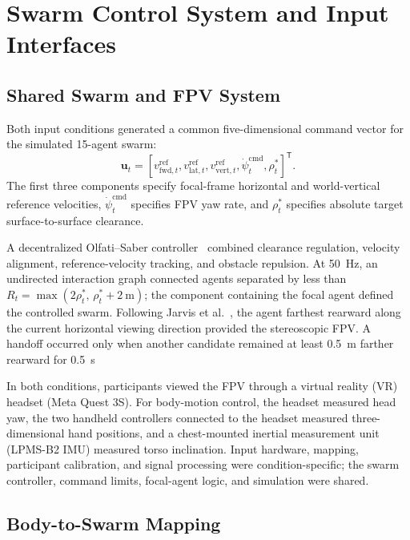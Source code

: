 \section{Swarm Control System and Input Interfaces}

\subsection{Shared Swarm and FPV System}
\label{sec:system}

Both input conditions generated a common five-dimensional command vector for
the simulated 15-agent swarm:
\begin{equation}
\mathbf{u}_t =
\left[
v_{\mathrm{fwd},t}^{\mathrm{ref}},
v_{\mathrm{lat},t}^{\mathrm{ref}},
v_{\mathrm{vert},t}^{\mathrm{ref}},
\dot{\psi}_{t}^{\mathrm{cmd}},
\rho_t^{*}
\right]^{\mathsf T}.
\label{eq:swarm_command}
\end{equation}
The first three components specify focal-frame horizontal and world-vertical
reference velocities, $\dot{\psi}_{t}^{\mathrm{cmd}}$ specifies FPV yaw rate,
and $\rho_t^{*}$ specifies absolute target surface-to-surface clearance.

A decentralized Olfati--Saber controller~\cite{olfatisaber2006flocking}
combined clearance regulation, velocity alignment, reference-velocity
tracking, and obstacle repulsion. At 50~Hz, an undirected interaction graph
connected agents separated by less than
$R_t=\max(2\rho_t^{*},\,\rho_t^{*}+2~\mathrm{m})$; the component containing
the focal agent defined the controlled swarm. Following Jarvis et
al.~\cite{ben_focaldrone}, the agent farthest rearward along the current
horizontal viewing direction provided the stereoscopic FPV. A handoff occurred
only when another candidate remained at least 0.5~m farther rearward for
0.5~s 

In both conditions, participants viewed the FPV through a virtual reality (VR) headset (Meta Quest 3S). For body-motion control, the headset measured head yaw, the two handheld controllers connected to the headset measured three-dimensional hand positions, and a chest-mounted inertial measurement unit (LPMS-B2 IMU) measured torso inclination. Input hardware, mapping, participant calibration, and signal processing were condition-specific; the swarm controller, command limits, focal-agent logic, and simulation were shared.

\subsection{Body-to-Swarm Mapping}
\label{sec:mapping}



